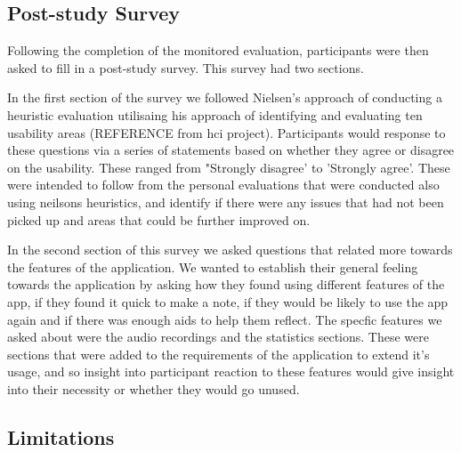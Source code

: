 \documentclass{l4proj}
\begin{document}
\subsection{Post-study Survey}

Following the completion of the monitored evaluation, participants were then asked to fill in a post-study survey. This
survey had two sections.
\par 
In the first section of the survey we followed Nielsen’s approach of conducting a heuristic evaluation
utilisaing his approach of identifying and evaluating ten usability areas (REFERENCE from hci project).
Participants would response to these questions via a series of statements based on whether they agree or disagree on the 
usability. These ranged from "Strongly disagree' to 'Strongly agree'. These were intended to follow from the personal evaluations
that were conducted also using neilsons heuristics, and identify if there were any issues that had not been picked up and areas
that could be further improved on. 
\par 
In the second section of this survey we asked questions that related more towards the features of the application. We wanted
to establish their general feeling towards the application by asking how they found using different features of the app,
if they found it quick to make a note, if they would be likely to use the app again and if there was enough aids to help
them reflect. The specfic features we asked about were the audio recordings and the statistics sections. These were sections
that were added to the requirements of the application to extend it's usage, and so insight into participant reaction to these 
features would give insight into their necessity or whether they would go unused. 

\subsection{Limitations}
\end{document}
